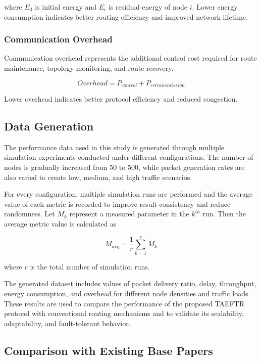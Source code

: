 \documentclass[a4paper,fleqn]{cas-dc}
\numberwithin{equation}{section}
\begin{document}
where $E_0$ is initial energy and $E_i$ is residual energy of node $i$. Lower energy consumption indicates better routing efficiency and improved network lifetime.

\subsubsection{Communication Overhead}

Communication overhead represents the additional control cost required for route maintenance, topology monitoring, and route recovery.

\begin{equation}
Overhead=P_{control}+P_{retransmission}
\end{equation}

Lower overhead indicates better protocol efficiency and reduced congestion.

\subsection{Data Generation}

The performance data used in this study is generated through multiple simulation experiments conducted under different configurations. The number of nodes is gradually increased from 50 to 500, while packet generation rates are also varied to create low, medium, and high traffic scenarios.

For every configuration, multiple simulation runs are performed and the average value of each metric is recorded to improve result consistency and reduce randomness. Let $M_k$ represent a measured parameter in the $k^{th}$ run. Then the average metric value is calculated as

\begin{equation}
M_{avg}=\frac{1}{r}\sum_{k=1}^{r}M_k
\end{equation}

where $r$ is the total number of simulation runs.

The generated dataset includes values of packet delivery ratio, delay, throughput, energy consumption, and overhead for different node densities and traffic loads. These results are used to compare the performance of the proposed TAEFTR protocol with conventional routing mechanisms and to validate its scalability, adaptability, and fault-tolerant behavior.


\subsection{Comparison with Existing Base Papers}
\end{document}
